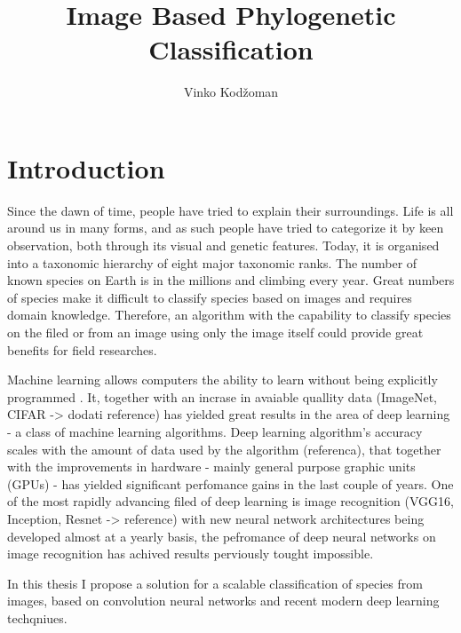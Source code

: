 \documentclass[times, utf8, diplomski]{fer}
\begin{document}
\title{Image Based Phylogenetic Classification}
\author{Vinko Kodžoman}

\maketitle

\izvornik


\tableofcontents

\chapter{Introduction}
Since the dawn of time, people have tried to explain their surroundings. Life is all around us in many forms, and as such people have tried to categorize it by keen observation, both through its visual and genetic features. Today, it is organised into a taxonomic hierarchy of eight major taxonomic ranks. The number of known species on Earth is in the millions and climbing every year. Great numbers of species make it difficult to classify species based on images and requires domain knowledge. Therefore, an algorithm with the capability to classify species on the filed or from an image using only the image itself could provide great benefits for field researches. \par
Machine learning allows computers the ability to learn without being explicitly programmed \citep{samuel_studies_1959}. It, together with an incrase in avaiable quallity data (ImageNet, CIFAR -> dodati reference) has yielded great results in the area of deep learning - a class of machine learning algorithms. Deep learning algorithm's accuracy scales with the amount of data used by the algorithm (referenca), that together with the improvements in hardware - mainly general purpose graphic units (GPUs) - has yielded significant perfomance gains in the last couple of years. One of the most rapidly advancing filed of deep learning is image recognition (VGG16, Inception, Resnet -> reference) with new neural network architectures being developed almost at a yearly basis, the pefromance of deep neural networks on image recognition has achived results perviously tought 	impossible. \par
In this thesis I propose a solution for a scalable classification of species from images, based on convolution neural networks and recent modern deep learning techqniues.
\end{document}
